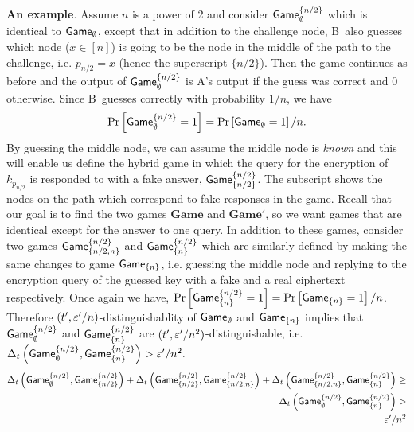 \documentclass{article}
\def\B{{\sf B}}
\def\A{{\sf A}}
\newcommand{\game}{{\sf Game}}
\newcommand{\dgame}{{\mathbf{Game}}}
\newcommand{\dgg}[2]{\game_{#1}^{#2}}
\newcommand{\dgb}[2]{\game_{\cub{#1}}^{\cub{#2}}}
\begin{document}
  \textbf{An example}. Assume $n$ is a power of 2 and consider $\game^{\{n/2\}}_{\emptyset}$ which is identical to $\game_{\emptyset}$, except that in addition to the challenge node, \B~also guesses which node ($x\in [n]$) is going to be the node in the middle of the path to the challenge, i.e. $p_{n/2}=x$ (hence the superscript $\{n/2\}$). Then the game continues as before and the output of $\dgg{\emptyset}{\{n/2\}}$ is \A's output if the guess was correct and 0 otherwise. Since \B~guesses correctly with probability $1/n$, we have 
\[\prob{\dgg{\emptyset}{\cub{n/2}}=1}= \prob{\game_{\emptyset}=1}/n.\]
  By guessing the middle node, we can assume the middle node is \textit{known} and this will enable us define the hybrid game in which the query for the encryption of $k_{p_{n/2}}$ is responded to with a fake answer, $\dgb{n/2}{n/2}$. The subscript shows the nodes on the path which correspond to fake responses in the game. Recall that our goal is to find the two games $\dgame$ and $\dgame'$, so we want games that are identical except for the answer to one query. In addition to these games, consider two games $\dgb{n/2,n}{n/2}$ and $\dgb{n}{n/2}$ which are similarly defined by making the same changes to game $\game_{\{n\}}$, i.e. guessing the middle node and replying to the encryption query  of the guessed key with a fake and a real ciphertext respectively. Once again we have, $\prob{\dgb{n}{n/2}=1}= \prob{\game_{\{n\}}=1}/n$. Therefore $(t',\varepsilon'/n)$-distinguishablity of $\game_{\emptyset}$ and $\game_{\{n\}}$ implies that $\dgg{\emptyset}{\cub{n/2}}$ and $\dgb{n}{n/2}$ are $(t',\varepsilon'/n^2)$-distinguishable, i.e. $\dElta{\dgg{\emptyset}{\cub{n/2}},\dgb{n}{n/2}} > \eps'/n^2.$
\begin{align}
\dElta{\dgg{\emptyset}{\cub{n/2}}, \dgb{n/2}{n/2}} + \dElta{ \dgb{n/2}{n/2},\dgb{n/2,n}{n/2}} + \dElta{ \dgb{n/2,n}{n/2}, \dgb{n}{n/2}} \geq \nonumber \\ \dElta{\dgg{\emptyset}{\cub{n/2}},\dgb{n}{n/2}} > \nonumber \\ \eps'/n^2 \label{3.2} 
\end{align}
\end{document}
